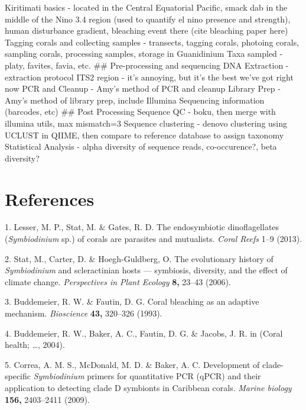 \documentclass[]{article}
\begin{document}
Kiritimati basics - located in the Central Equatorial Pacific, smack dab
in the middle of the Nino 3.4 region (used to quantify el nino presence
and strength), human disturbance gradient, bleaching event there (cite
bleaching paper here) Tagging corals and collecting samples - transects,
tagging corals, photoing corals, sampling corals, processing samples,
storage in Guanidinium Taxa sampled - platy, favites, favia, etc. \#\#
Pre-processing and sequencing DNA Extraction - extraction protocol ITS2
region - it's annoying, but it's the best we've got right now PCR and
Cleanup - Amy's method of PCR and cleanup Library Prep - Amy's method of
library prep, include Illumina Sequencing information (barcodes, etc)
\#\# Post Processing Sequence QC - boku, then merge with illumina utils,
max mismatch=3 Sequence clustering - denovo clustering using UCLUST in
QIIME, then compare to reference database to assign taxonomy Statistical
Analysis - alpha diversity of sequence reads, co-occurence?, beta
diversity?

\section{References}\label{references}

\hypertarget{refs}{}
\hypertarget{ref-Lesser:2013tu}{}
1. Lesser, M. P., Stat, M. \& Gates, R. D. The endosymbiotic
dinoflagellates (\emph{Symbiodinium} sp.) of corals are parasites and
mutualists. \emph{Coral Reefs} 1--9 (2013).

\hypertarget{ref-Stat:2006ww}{}
2. Stat, M., Carter, D. \& Hoegh-Guldberg, O. The evolutionary history
of \emph{Symbiodinium} and scleractinian hosts --- symbiosis, diversity,
and the effect of climate change. \emph{Perspectives in Plant Ecology}
\textbf{8,} 23--43 (2006).

\hypertarget{ref-Buddemeier:1993bb}{}
3. Buddemeier, R. W. \& Fautin, D. G. Coral bleaching as an adaptive
mechanism. \emph{Bioscience} \textbf{43,} 320--326 (1993).

\hypertarget{ref-Buddemeier:2004vj}{}
4. Buddemeier, R. W., Baker, A. C., Fautin, D. G. \& Jacobs, J. R. in
(Coral health; \ldots{}, 2004).

\hypertarget{ref-Correa:2009jy}{}
5. Correa, A. M. S., McDonald, M. D. \& Baker, A. C. Development of
clade-specific \emph{Symbiodinium} primers for quantitative PCR (qPCR)
and their application to detecting clade D symbionts in Caribbean
corals. \emph{Marine biology} \textbf{156,} 2403--2411 (2009).
\end{document}
